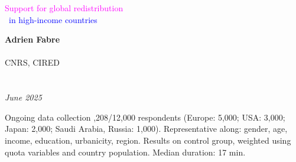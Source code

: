 \documentclass[aspectratio=169,xcolor=dvipsnames, 11pt,mathserif]{beamer}
\begin{document}

\begin{frame}
\thispagestyle{empty}
\begin{center}
\begin{LARGE}
\textcolor{magenta}{Support for global redistribution}\\~\textcolor{blue}{in high-income countries} \end{LARGE}
\vspace{1cm}

\textbf{Adrien Fabre} \\ \quad \\
CNRS, CIRED \\ \quad \\ \quad \\
\textit{June 2025} 
\end{center}
\bigskip
\end{frame}


\begin{frame}{Ongoing data collection}
\bbvs
{},208/12,000 respondents (Europe: 5,000; USA: 3,000; Japan: 2,000; Saudi Arabia, Russia: 1,000).
\ip Representative along: gender, age, income, education, urbanicity, region.
\ip Results on control group, weighted using quota variables and country population.
\ip Median duration: 17 min.
\ee
\end{frame}


\end{document}
